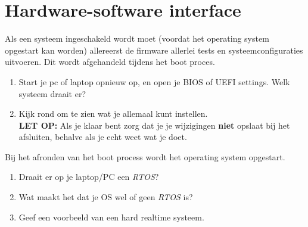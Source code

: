 \section{Hardware-software interface}
Als een systeem ingeschakeld wordt moet (voordat het operating system opgestart kan worden) allereerst de firmware allerlei tests en systeemconfiguraties uitvoeren. Dit wordt afgehandeld tijdens het boot
proces.


\begin{opdracht}
    \begin{minipage}[t]{0.9\linewidth}
        \begin{enumerate}
        \item [A] Start je pc of laptop opnieuw op, en open je BIOS of UEFI
        settings. Welk systeem draait er?
        \item [B] Kijk rond om te zien wat je allemaal kunt instellen. \\
        \textbf{LET OP: } Als je klaar bent zorg dat je je wijzigingen \textbf{niet} opslaat bij het afsluiten, behalve als je echt weet wat je doet.
        \end{enumerate}
    \end{minipage}
\end{opdracht}

Bij het afronden van het boot process wordt het operating system opgestart. 


\begin{opdracht}
    \begin{minipage}[t]{0.9\linewidth}
        \begin{enumerate}
        \item [A] Draait er op je laptop/PC een \textit{RTOS}?
        \item [B] Wat maakt het dat je OS wel of geen \textit{RTOS} is?
        \item [C] Geef een voorbeeld van een hard realtime systeem.
        \end{enumerate}
    \end{minipage}
\end{opdracht}

